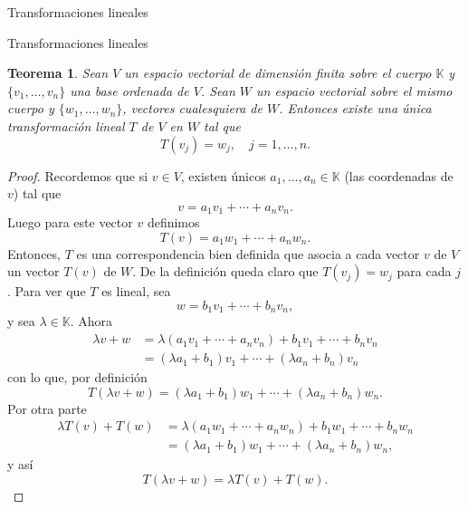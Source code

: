 \documentclass[a4paper,12pt,twoside,spanish,reqno]{amsbook}
\numberwithin{equation}{section}
\newtheorem{teorema}{Teorema}[section]
\theoremstyle{definition}
\theoremstyle{remark}
\newcommand{\K}{\mathbb K}
\begin{document}
\begin{chapter}{Transformaciones lineales}
\begin{section}{Transformaciones lineales}
        
        \begin{teorema}\label{th-tl-definida-en-base}
            Sean $V$ un espacio vectorial de dimensión finita sobre el cuerpo $\K$ y $\{v_1,\ldots,v_n\}$  una base ordenada de $V$. Sean $W$ un espacio vectorial sobre el mismo cuerpo y $\{w_1,\ldots,w_n\}$, vectores cualesquiera de $W$. Entonces existe una única transformación  lineal $T$ de $V$ en $W$ tal que
            \begin{equation*}
            T(v_j) = w_j, \quad j=1,\ldots,n.
            \end{equation*}
        \end{teorema}
            \begin{proof}
                Recordemos que si $v \in V$,  existen únicos $a_1,\ldots,a_n \in \K$ (las coordenadas de $v$) tal que $$v = a_1v_1 + \cdots+a_n v_n.$$  Luego para este vector $v$  definimos
                \begin{equation*}
                    T(v) = a_1w_1 + \cdots+a_n w_n.
                \end{equation*}
                Entonces, $T$ es una correspondencia bien definida que asocia a cada vector $v$ 
                de $V$ un vector $T(v)$ de $W$. De la definición queda claro que $T(v_j) = w_j$ para cada $j$. Para ver que $T$ es lineal, sea
                \begin{equation*}
                    w = b_1v_1 + \cdots+b_n v_n,
                \end{equation*}
                y sea  $\lambda \in \K$. Ahora
                \begin{align*}
                    \lambda v+w &= \lambda(a_1v_1 + \cdots+a_n v_n) + b_1v_1 + \cdots+b_n v_n \\
                    &= (\lambda a_1+b_1)v_1 + \cdots+(\lambda a_n+b_n)v_n
                \end{align*}
                con lo que, por definición
                \begin{equation*}
                    T(\lambda v+w) =(\lambda a_1+b_1)w_1 + \cdots+(\lambda a_n+b_n)w_n. 
                \end{equation*}
                Por otra parte
                \begin{align*}
                \lambda  T(v) + T(w) &= \lambda (a_1w_1 + \cdots+a_n w_n)+b_1w_1 + \cdots+b_n w_n	 \\
                 &=(\lambda a_1+b_1)w_1 + \cdots+(\lambda a_n+b_n)w_n ,			
                \end{align*}
                y así
                \begin{equation*}
                    T(\lambda v+w) = 	\lambda  T(v) + T(w).
                \end{equation*}
                

\end{proof}
\end{section}
\end{chapter}
\end{document}
